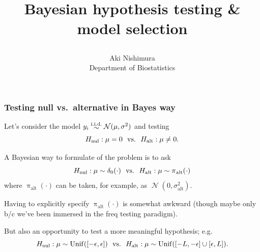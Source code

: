 \documentclass[18pt]{beamer}
\title{%
	\centerline{Bayesian hypothesis testing \& model selection}%
}
\author{%
	Aki Nishimura\\
	Department of Biostatistics%
}
\date{}
\newcommand{\defineTightSpacing}{%
	\setlength{\abovedisplayskip}{.25\baselineskip}%
	\setlength{\belowdisplayskip}{.25\baselineskip}%
}
\newcommand{\iidSim}{\mathrel{\raisebox{-.3ex}{$\overset{\text{i.i.d.}}{\sim}$}}}
\newcommand{\unifDist}{\mathrm{Unif}}
\newcommand{\normalDist}{\operatorname{\mathcal{N}}}
\newcommand{\density}{\operatorname{\pi}}
\newcommand{\hypothesis}{H}
\newcommand{\nullSub}{\mathrm{nul}}
\newcommand{\altSub}{\mathrm{alt}}
\begin{document}
\maketitle


\begin{frame}
\frametitle{Testing null vs.\ alternative in Bayes way}
Let's consider the model $y_i \iidSim \normalDist(\mu, \sigma^2)$ and testing
\begin{equation*} \defineTightSpacing%
\hypothesis_\nullSub: \mu = 0 
	\ \text{ vs.\ } \ 
	\hypothesis_\altSub: \mu \neq 0.
\end{equation*}

\pause
A Bayesian way to formulate of the problem is to ask
\begin{equation*} \defineTightSpacing%
\hypothesis_\nullSub: \mu \sim \delta_0(\cdot) 
	\ \text{ vs.\ } \ 
	\hypothesis_\altSub: \mu \sim \density_\altSub(\cdot) 
\end{equation*}
where $\density_\altSub(\cdot)$ can be taken, for example, as $\normalDist(0, \sigma_\altSub^2)$.

\pause
\smallskip
Having to explicitly specify $\density_\altSub(\cdot)$ is somewhat awkward (though maybe only b/c we've been immersed in the freq testing paradigm).

\pause
But also an opportunity to test a more meaningful hypothesis; e.g.\
\begin{equation*} \defineTightSpacing%
\hypothesis_\nullSub: \mu \sim \unifDist([-\epsilon, \epsilon])
	\ \text{ vs.\ } \ 
	\hypothesis_\altSub: \mu \sim \unifDist([-L, -\epsilon] \cup [\epsilon, L]).
\end{equation*}
\end{frame}
\end{document}

